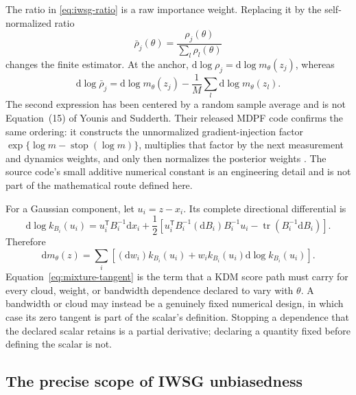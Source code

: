 \documentclass[11pt]{article}
\newcommand{\dd}{\mathrm{d}}
\begin{document}
The ratio in \eqref{eq:iwsg-ratio} is a raw importance weight.  Replacing it
by the self-normalized ratio
\begin{equation}
 \bar\rho_j(\theta)=\frac{\rho_j(\theta)}{\sum_l\rho_l(\theta)}
 \label{eq:self-normalized-ratio}
\end{equation}
changes the finite estimator.  At the anchor,
$\dd\log\rho_j=\dd\log m_\theta(z_j)$, whereas
\begin{equation}
 \dd\log\bar\rho_j
 =\dd\log m_\theta(z_j)
  -\frac1M\sum_l\dd\log m_\theta(z_l).
 \label{eq:centered-ratio-tangent}
\end{equation}
The second expression has been centered by a random sample average and is not
Equation~(15) of Younis and Sudderth.  Their released MDPF code confirms the
same ordering: it constructs the unnormalized gradient-injection factor
$\exp\{\log m-\operatorname{stop}(\log m)\}$, multiplies that factor by the
next measurement and dynamics weights, and only then normalizes the posterior
weights \citep{youniscode2023}.  The source code's small additive numerical
constant is an engineering detail and is not part of the mathematical route
defined here.

For a Gaussian component, let $u_i=z-x_i$.  Its complete directional
differential is
\begin{equation}
 \dd\log k_{B_i}(u_i)
 =
 u_i^\mathsf{T}B_i^{-1}\dd x_i
 +\frac12\left[
   u_i^\mathsf{T}B_i^{-1}(\dd B_i)B_i^{-1}u_i
   -\operatorname{tr}(B_i^{-1}\dd B_i)
 \right].
 \label{eq:component-tangent}
\end{equation}
Therefore
\begin{equation}
 \dd m_\theta(z)
 =\sum_i\left[
       (\dd w_i)k_{B_i}(u_i)
       +w_i k_{B_i}(u_i)\dd\log k_{B_i}(u_i)
     \right]. \label{eq:mixture-tangent}
\end{equation}
Equation~\eqref{eq:mixture-tangent} is the term that a KDM score path must
carry for every cloud, weight, or bandwidth dependence declared to vary with
$\theta$.  A bandwidth or cloud may instead be a genuinely fixed numerical
design, in which case its zero tangent is part of the scalar's definition.
Stopping a dependence that the declared scalar retains is a partial
derivative; declaring a quantity fixed before defining the scalar is not.

\subsection{The precise scope of IWSG unbiasedness}
\label{sec:iwsg-scope}
\end{document}
